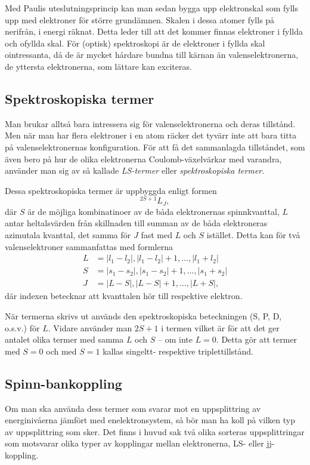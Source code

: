 \documentclass[11pt,a4paper]{article}
\begin{document}
Med Paulis uteslutningsprincip kan man sedan bygga upp elektronskal
som fylls upp med elektroner för större grundämnen. Skalen i dessa
atomer fylls på nerifrån, i energi räknat. Detta leder till att det
kommer finnas elektroner i fyllda och ofyllda skal. För (optisk)
spektroskopi är de elektroner i fyllda skal ointressanta, då de är
mycket hårdare bundna till kärnan än valenselektronerna, de yttersta
elektronerna, som lättare kan exciteras. 



\subsection{Spektroskopiska termer}\label{sec:term}
Man brukar alltså bara intressera sig för valenselektronerna och deras
tillstånd. Men när man har flera elektroner i en atom räcker det
tyvärr inte att bara titta på valenselektronernas konfiguration. För att
få det sammanlagda tillståndet, som även bero på hur de olika
elektronerna Coulomb-växelvärkar med varandra, använder man sig av så
kallade \emph{LS-termer} eller \emph{spektroskopiska termer}.

Dessa spektroskopiska termer är uppbyggda enligt formen \cite{Bransden}
\[
^{2S+1}L_J,
\]
där $S$ är de möjliga kombinatinoer av de båda elektronernas
spinnkvanttal, $L$ antar heltalsvärden från skillnaden till summan av
de båda elektroneras azimutala kvanttal, det samma för $J$ fast med
$L$ och $S$ istället. Detta kan för två valenselektroner sammanfattas
med formlerna \cite{Bransden}
\begin{equation*}
\begin{aligned}
L &= |l_1-l_2|, |l_1- l_2|+1, \ldots, |l_1+l_2|\\
S &= |s_1-s_2|, |s_1- s_2|+1, \ldots, |s_1+s_2|\\
J &= |L-S|, |L-S| +1, \ldots, |L+S|,
\end{aligned}
\end{equation*}
där indexen betecknar att kvanttalen hör till respektive elektron.

När termerna skrivs ut används den spektroskopiska beteckningen (S, P,
D, o.s.v.) för $L$. Vidare använder man $2S+1$ i termen vilket är för
att det ger antalet olika termer med samma $L$ och $S$ -- om inte
$L=0$. Detta gör att termer med $S=0$ och med $S=1$ kallas singeltt-
respektive triplettillstånd. 

\subsection{Spinn-bankoppling}\label{sec:LS}
Om man ska använda dess termer som svarar mot en uppsplittring av energinivåerna
jämfört med enelektronsystem, så bör man ha koll på vilken typ av uppsplittring
som sker. Det finns i huvud sak två olika sorteras uppsplittringar som motsvarar
olika typer av kopplingar mellan elektronerna, LS- eller jj-koppling. 
\end{document}
